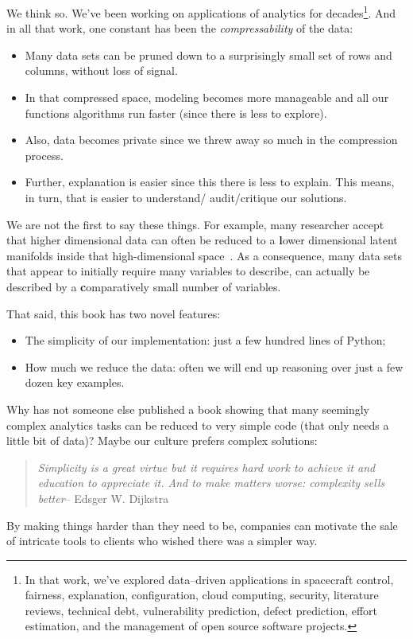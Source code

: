 \documentclass[landscape,	DIV=calc,%
							paper=letter,%
							fontsize=10pt,%
							twocolumn]{scrartcl}	 					%
\begin{document}
We think so.
We've been working on applications of analytics for decades\footnote{
In that work, we've explored
data--driven applications in 
spacecraft control, fairness, explanation, configuration, cloud computing,  security, literature reviews,
technical  debt,  vulnerability prediction, defect prediction, effort estimation,  and the management
of open source software projects.}. And in all that work, one constant has been the  {\em compressability}
of the data:
\begin{itemize}
    \item
Many data sets can be pruned down to a surprisingly small set of rows and columns,
without loss of signal.
\item
In that compressed space, modeling becomes more manageable
and 
all our functions algorithms run faster (since there is less to explore).
\item
Also, 
data becomes private
since we threw away so much in the compression process.
\item
    Further,
explanation is easier since this there is less to explain. 
This means, in turn, that is easier to understand/ audit/critique
our solutions.
\end{itemize}
We are not the first to say these things.
For example, many researcher accept that higher dimensional data can often be reduced
to a
{\textbf lower dimensional latent manifolds} inside that high-dimensional
space~\cite{zhu2005semi}.
As a consequence, many data sets
that appear to initially require many variables to describe, can
actually be described by a {\textbf comparatively small number of variables}.

That said, this book has two novel features:
\begin{itemize}
    \item The simplicity of our implementation: just a few hundred  lines of Python;
    \item How much we reduce the data: often we will end up reasoning over just a few dozen key examples.
\end{itemize}
Why has not someone else published a  book showing that many seemingly complex
analytics tasks can be reduced to very simple code (that only needs a little bit of data)?
Maybe our culture prefers complex solutions:
\begin{quote}
    {\em 
Simplicity is a great virtue but it requires hard work to achieve
it and education to appreciate it. And to make matters worse:
    complexity sells better}\newline -- Edsger W. Dijkstra
\end{quote}
By making things harder than they need to be, companies can motivate
the sale  of intricate tools to clients who wished there was a
simpler way. 
\end{document}
